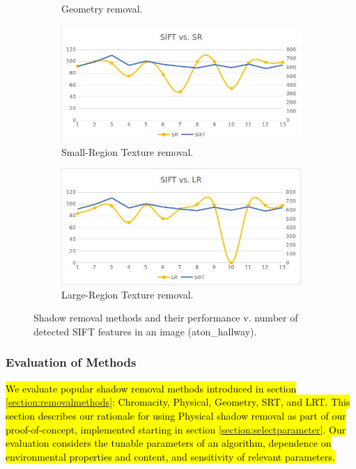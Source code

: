 \documentclass[12pt]{report}
\begin{document}
\begin{figure}
\begin{subfigure}{.49\linewidth}
  \caption{Geometry removal.}
\end{subfigure}
\hfill
\begin{subfigure}{.49\linewidth}
  \includegraphics[width=1\linewidth]{figures/selectinganalgorithm_srt.jpg}
  \caption{Small-Region Texture removal.}
\end{subfigure}
\hfill
\begin{subfigure}{.49\linewidth}
  \includegraphics[width=1\linewidth]{figures/selectinganalgorithm_lrt.jpg}
  \caption{Large-Region Texture removal.}
\end{subfigure}

\caption{Shadow removal methods and their performance v. number of detected SIFT features in an image (aton\_hallway).}
\label{fig:selectinganalgorithm}
\end{figure}

\subsubsection{Evaluation of Methods}

\hl{We evaluate popular shadow removal methods introduced in section \ref{section:removalmethods}: Chromacity, Physical, Geometry, SRT, and LRT. This section describes our rationale for using Physical shadow removal as part of our proof-of-concept, implemented starting in section \ref{section:selectparameter}. Our evaluation considers the tunable parameters of an algorithm, dependence on environmental properties and content, and sensitivity of relevant parameters.}
\end{document}
